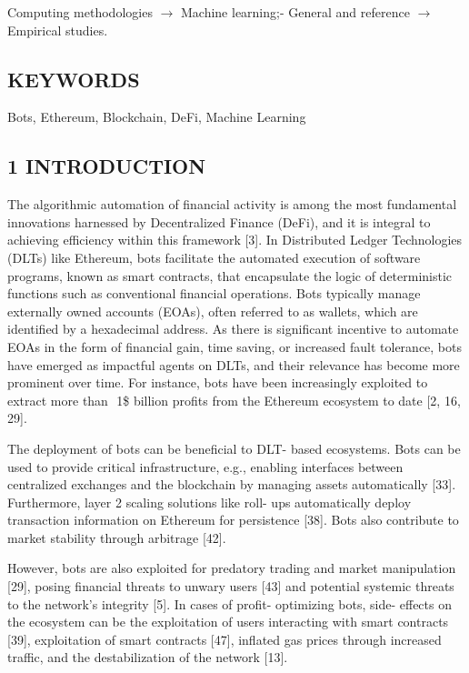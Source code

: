 Computing methodologies \(\rightarrow\) Machine learning;- General and reference \(\rightarrow\) Empirical studies.

\subsection*{KEYWORDS}

Bots, Ethereum, Blockchain, DeFi, Machine Learning

\subsection*{1 INTRODUCTION}

The algorithmic automation of financial activity is among the most fundamental innovations harnessed by Decentralized Finance (DeFi), and it is integral to achieving efficiency within this framework [3]. In Distributed Ledger Technologies (DLTs) like Ethereum, bots facilitate the automated execution of software programs, known as smart contracts, that encapsulate the logic of deterministic functions such as conventional financial operations. Bots typically manage externally owned accounts (EOAs), often referred to as wallets, which are identified by a hexadecimal address. As there is significant incentive to automate EOAs in the form of financial gain, time saving, or increased fault tolerance, bots have emerged as impactful agents on DLTs, and their relevance has become more prominent over time. For instance, bots have been increasingly exploited to extract more than \(\) 1\$ billion profits from the Ethereum ecosystem to date [2, 16, 29].

The deployment of bots can be beneficial to DLT- based ecosystems. Bots can be used to provide critical infrastructure, e.g., enabling interfaces between centralized exchanges and the blockchain by managing assets automatically [33]. Furthermore, layer 2 scaling solutions like roll- ups automatically deploy transaction information on Ethereum for persistence [38]. Bots also contribute to market stability through arbitrage [42].

However, bots are also exploited for predatory trading and market manipulation [29], posing financial threats to unwary users [43] and potential systemic threats to the network's integrity [5]. In cases of profit- optimizing bots, side- effects on the ecosystem can be the exploitation of users interacting with smart contracts [39], exploitation of smart contracts [47], inflated gas prices through increased traffic, and the destabilization of the network [13].

